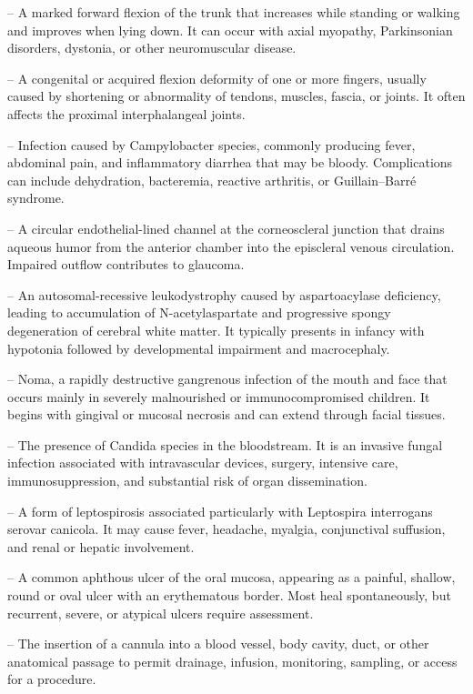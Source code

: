 -- A marked forward flexion of the trunk that increases while standing or walking and improves when lying down. It can occur with axial myopathy, Parkinsonian disorders, dystonia, or other neuromuscular disease.

-- A congenital or acquired flexion deformity of one or more fingers, usually caused by shortening or abnormality of tendons, muscles, fascia, or joints. It often affects the proximal interphalangeal joints.

-- Infection caused by Campylobacter species, commonly producing fever, abdominal pain, and inflammatory diarrhea that may be bloody. Complications can include dehydration, bacteremia, reactive arthritis, or Guillain--Barré syndrome.

-- A circular endothelial-lined channel at the corneoscleral junction that drains aqueous humor from the anterior chamber into the episcleral venous circulation. Impaired outflow contributes to glaucoma.

-- An autosomal-recessive leukodystrophy caused by aspartoacylase deficiency, leading to accumulation of N-acetylaspartate and progressive spongy degeneration of cerebral white matter. It typically presents in infancy with hypotonia followed by developmental impairment and macrocephaly.

-- Noma, a rapidly destructive gangrenous infection of the mouth and face that occurs mainly in severely malnourished or immunocompromised children. It begins with gingival or mucosal necrosis and can extend through facial tissues.

-- The presence of Candida species in the bloodstream. It is an invasive fungal infection associated with intravascular devices, surgery, intensive care, immunosuppression, and substantial risk of organ dissemination.

-- A form of leptospirosis associated particularly with Leptospira interrogans serovar canicola. It may cause fever, headache, myalgia, conjunctival suffusion, and renal or hepatic involvement.

-- A common aphthous ulcer of the oral mucosa, appearing as a painful, shallow, round or oval ulcer with an erythematous border. Most heal spontaneously, but recurrent, severe, or atypical ulcers require assessment.

-- The insertion of a cannula into a blood vessel, body cavity, duct, or other anatomical passage to permit drainage, infusion, monitoring, sampling, or access for a procedure.

